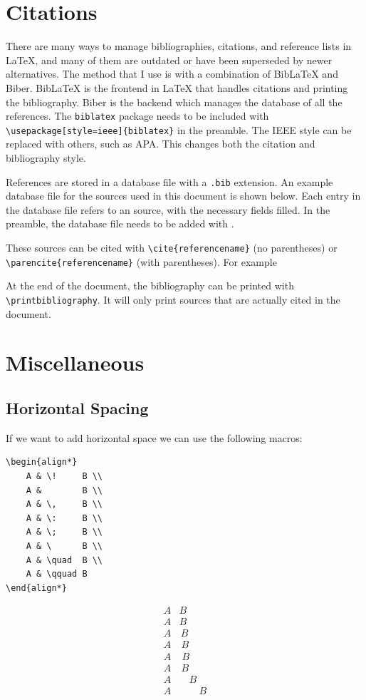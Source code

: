 \documentclass[11pt, twoside]{article}
\begin{document}
\section{Citations}
There are many ways to manage bibliographies, citations, and reference lists in \LaTeX{}, and many of them are outdated or have been superseded by newer alternatives. The method that I use is with a combination of BibLaTeX and Biber. BibLaTeX is the frontend in \LaTeX{} that handles citations and printing the bibliography. Biber is the backend which manages the database of all the references. The \lstinline{biblatex} package needs to be included with \lstinline|\usepackage[style=ieee]{biblatex}| in the preamble. The IEEE style can be replaced with others, such as APA. This changes both the citation and bibliography style.

References are stored in a database file with a \lstinline{.bib} extension. An example database file for the sources used in this document is shown below. Each entry in the database file refers to an source, with the necessary fields filled. In the preamble, the database file needs to be added with \lstinline||.

These sources can be cited with \lstinline|\cite{referencename}| (no parentheses) or \lstinline|\parencite{referencename}| (with parentheses). For example \parencite{colu92} \cite{phil99}

At the end of the document, the bibliography can be printed with \lstinline{\printbibliography}. It will only print sources that are actually cited in the document.
\newpage
\section{Miscellaneous}
\subsection{Horizontal Spacing}
If we want to add horizontal space we can use the following macros:
\begin{lstlisting}
\begin{align*}
    A & \!     B \\
    A &        B \\
    A & \,     B \\
    A & \:     B \\
    A & \;     B \\
    A & \      B \\
    A & \quad  B \\
    A & \qquad B
\end{align*}
\end{lstlisting}
\begin{align*}
    A & \!     B \\
    A & B        \\
    A & \,     B \\
    A & \:     B \\
    A & \;     B \\
    A & \      B \\
    A & \quad  B \\
    A & \qquad B
\end{align*}
\end{document}
